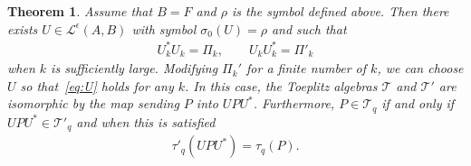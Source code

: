 \documentclass[10pt,a4paper]{article}
\newtheorem{theo}{Theorem}[section]
\theoremstyle{definition}
\numberwithin{equation}{section}
\newcommand{\si}{{\sigma}}
\newcommand{\ep}{\epsilon}
\newcommand{\lag}{\mathcal{L}}
\newcommand{\clT}{\mathcal{T}}
\begin{document}
\begin{theo}\label{theo:unitary_equivalence}
Assume that $B = F$ and $\rho$ is the symbol defined above. Then there exists $U \in \lag ^{\ep}(A,B)$ with symbol $\si_0(U) = \rho$ and such that
\begin{gather}\label{eq:U}
U^*_k U_k = \Pi_k, \qquad U_k U_k^* = \Pi'_k
\end{gather}
when $k$ is sufficiently large. Modifying $\Pi_k'$ for a finite number of $k$, we can choose $U$ so that~\eqref{eq:U} holds for any $k$. In this case, the Toeplitz algebras $ \clT$ and $\clT'$ are isomorphic by the map sending $P$ into $U P U^* $. Furthermore, $P \in \clT_q$ if and only if $UPU^* \in \clT'_q$ and when this is satisfied
\begin{gather}\label{eq:symbol_iso}
\tau'_q (U P U^*) = \tau_q (P).
\end{gather}
\end{theo}
\end{document}
